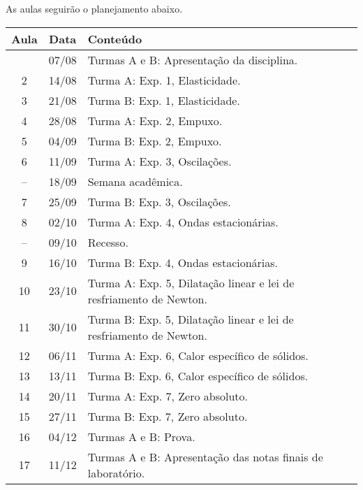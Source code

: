 As aulas seguirão o planejamento abaixo.
\begin{center}
\begin{longtable}{ccp{70mm}}
\toprule
Aula & Data & Conteúdo \\
\midrule
\endhead
\bottomrule
\endfoot
 1 & 07/08 & Turmas A e B: Apresentação da disciplina. \\
 2 & 14/08 & Turma A: Exp. 1, Elasticidade. \\
 3 & 21/08 & Turma B: Exp. 1, Elasticidade. \\
 4 & 28/08 & Turma A: Exp. 2, Empuxo. \\ 
 5 & 04/09 & Turma B: Exp. 2, Empuxo. \\
 6 & 11/09 & Turma A: Exp. 3, Oscilações. \\
-- & 18/09 & Semana acadêmica. \\
 7 & 25/09 & Turma B: Exp. 3, Oscilações. \\
 8 & 02/10 & Turma A: Exp. 4, Ondas estacionárias. \\
-- & 09/10 & Recesso. \\
 9 & 16/10 & Turma B: Exp. 4, Ondas estacionárias. \\
10 & 23/10 & Turma A: Exp. 5, Dilatação linear e lei de resfriamento de Newton. \\
11 & 30/10 & Turma B: Exp. 5, Dilatação linear e lei de resfriamento de Newton. \\
12 & 06/11 & Turma A: Exp. 6, Calor específico de sólidos. \\
13 & 13/11 & Turma B: Exp. 6, Calor específico de sólidos. \\
14 & 20/11 & Turma A: Exp. 7, Zero absoluto. \\
15 & 27/11 & Turma B: Exp. 7, Zero absoluto. \\
16 & 04/12 & Turmas A e B: Prova. \\
17 & 11/12 & Turmas A e B: Apresentação das notas finais de laboratório.
\end{longtable}
\end{center}


\cleardoublepage
